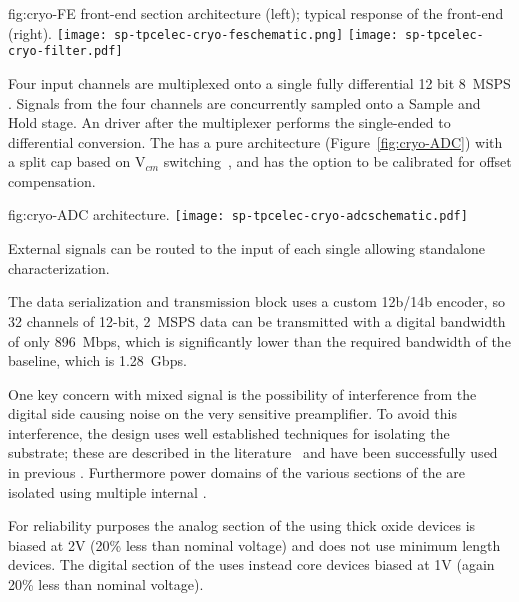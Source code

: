 \begin{dunefigure}
{fig:cryo-FE}
{ front-end section architecture (left); typical response of the  front-end (right).}
\texttt{[image: sp-tpcelec-cryo-feschematic.png]}
\texttt{[image: sp-tpcelec-cryo-filter.pdf]}
\end{dunefigure}

Four input channels are multiplexed onto a single fully differential 12 bit \SI{8}{MSPS} 
. Signals from the four channels are concurrently sampled onto a Sample and Hold 
stage. An  driver after the multiplexer performs the single-ended to differential 
conversion. The  has a pure  architecture (Figure~\ref{fig:cryo-ADC}) with a split 
cap  based on V$_{cm}$ switching~\cite{5482529}, and has the option to be 
calibrated for offset compensation.

\begin{dunefigure}
{fig:cryo-ADC}
{  architecture.}
\texttt{[image: sp-tpcelec-cryo-adcschematic.pdf]}
\end{dunefigure}

External signals can be routed to the input of each single  allowing standalone characterization.

The data serialization and transmission block uses a custom 12b/14b encoder, so 32 channels 
of 12-bit, \SI{2}{MSPS} data can be transmitted with a digital bandwidth of only \SI{896}{Mbps}, 
which is significantly lower than the required bandwidth of the baseline, which is \SI{1.28}{Gbps}.

One key concern with mixed signal  is the possibility of interference from the 
digital side causing noise on the very sensitive preamplifier. To avoid this interference, 
the  design uses well established techniques for isolating the substrate;
these are described in the literature~\cite{yeh} and have been successfully used in previous 
. Furthermore power domains of the various sections of the  are 
isolated using multiple internal .

For reliability purposes the analog section of the  using thick oxide devices 
is biased at 2V (20\% less than nominal voltage) and does not use minimum length devices.
The digital section of the  uses instead core devices biased at 1V (again 20\% 
less than nominal voltage).

